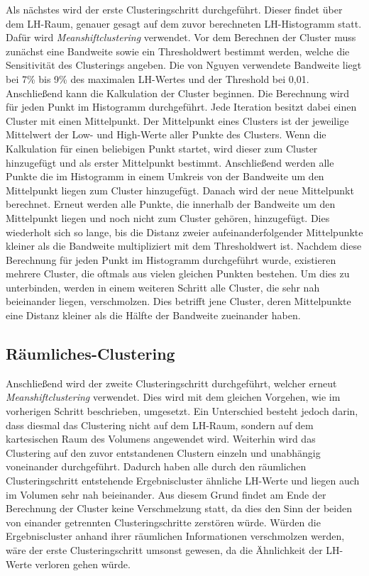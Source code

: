 Als nächstes wird der erste Clusteringschritt durchgeführt. Dieser findet über dem LH-Raum, genauer gesagt auf dem zuvor berechneten LH-Histogramm statt. Dafür wird \textit{Meanshiftclustering} verwendet.
\newline
Vor dem Berechnen der Cluster muss zunächst eine Bandweite sowie ein Thresholdwert bestimmt werden, welche die Sensitivität des Clusterings angeben. Die von Nguyen \cite{nguyen2012clustering} verwendete Bandweite liegt bei 7\% bis 9\% des maximalen LH-Wertes und der Threshold bei 0,01. Anschließend kann die Kalkulation der Cluster beginnen.
\newline
Die Berechnung wird für jeden Punkt im Histogramm durchgeführt. Jede Iteration besitzt dabei einen Cluster mit einen Mittelpunkt. Der Mittelpunkt eines Clusters ist der jeweilige Mittelwert der Low- und High-Werte aller Punkte des Clusters. Wenn die Kalkulation für einen beliebigen Punkt startet, wird dieser zum Cluster hinzugefügt und als erster Mittelpunkt bestimmt. Anschließend werden alle Punkte die im Histogramm in einem Umkreis von der Bandweite um den Mittelpunkt liegen zum Cluster hinzugefügt. Danach wird der neue Mittelpunkt berechnet. Erneut werden alle Punkte, die innerhalb der Bandweite um den Mittelpunkt liegen und noch nicht zum Cluster gehören, hinzugefügt. Dies wiederholt sich so lange, bis die Distanz zweier aufeinanderfolgender Mittelpunkte kleiner als die Bandweite multipliziert mit dem Thresholdwert ist.
\newline
Nachdem diese Berechnung für jeden Punkt im Histogramm durchgeführt wurde, existieren mehrere Cluster, die oftmals aus vielen gleichen Punkten bestehen. Um dies zu unterbinden, werden in einem weiteren Schritt alle Cluster, die sehr nah beieinander liegen, verschmolzen. Dies betrifft jene Cluster, deren Mittelpunkte eine Distanz kleiner als die Hälfte der Bandweite zueinander haben.



\subsection{Räumliches-Clustering}

Anschließend wird der zweite Clusteringschritt durchgeführt, welcher erneut \textit{Meanshiftclustering} verwendet. Dies wird mit dem gleichen Vorgehen, wie im vorherigen Schritt beschrieben, umgesetzt. Ein Unterschied besteht jedoch darin, dass diesmal das Clustering nicht auf dem LH-Raum, sondern auf dem kartesischen Raum des Volumens angewendet wird. Weiterhin wird das Clustering auf den zuvor entstandenen Clustern einzeln und unabhängig voneinander durchgeführt. Dadurch haben alle durch den räumlichen Clusteringschritt entstehende Ergebniscluster ähnliche LH-Werte und liegen auch im Volumen sehr nah beieinander.
\newline
Aus diesem Grund findet am Ende der Berechnung der Cluster keine Verschmelzung statt, da dies den Sinn der beiden von einander getrennten Clusteringschritte zerstören würde. Würden die Ergebniscluster anhand ihrer räumlichen Informationen verschmolzen werden, wäre der erste Clusteringschritt umsonst gewesen, da die Ähnlichkeit der LH-Werte verloren gehen würde.



